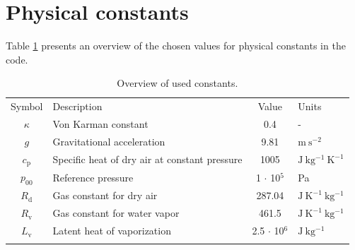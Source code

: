 \documentclass[gmd,manuscript]{copernicus}
\begin{document}
\appendix \section{Physical constants}
Table \ref{tab:constants} presents an overview of the chosen values for physical constants in the code.
\begin{table}[t]
\caption{Overview of used constants.}\label{tab:constants}
\begin{tabular}{clcl}
\tophline
Symbol & Description & Value & Units \\
\middlehline
$\kappa$ & Von Karman constant & 0.4 & -\\
$g$ & Gravitational acceleration & 9.81 & $\mathrm{m~s^{-2}}$\\
$c_\mathrm{p}$ & Specific heat of dry air at constant pressure & 1005 & $\mathrm{J~kg^{-1}~K^{-1}}$\\
$p_\mathrm{00}$ & Reference pressure & 1 $\cdot$ 10$^5$ & Pa\\
$R_\mathrm{d}$ & Gas constant for dry air & 287.04 & $\mathrm{J~K^{-1}~kg^{-1}}$\\
$R_\mathrm{v}$ & Gas constant for water vapor & 461.5 & $\mathrm{J~K^{-1}~kg^{-1}}$\\
$L_\mathrm{v}$ & Latent heat of vaporization & 2.5 $\cdot$ 10$^6$ & $\mathrm{J~kg^{-1}}$\\
\bottomhline
\end{tabular}
\end{table}

\iffalse
\end{document}
